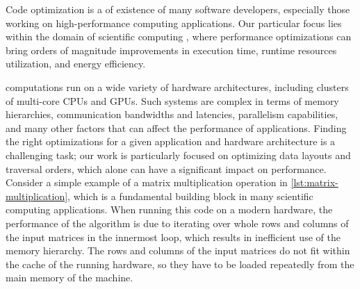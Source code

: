 







Code optimization is a  of existence of many software developers, especially those working on high-performance computing applications. Our particular focus lies within the domain of scientific computing , where performance optimizations can bring orders of magnitude improvements in execution time, runtime resources utilization, and energy efficiency.

 computations run on a wide variety of hardware architectures, including clusters of multi-core CPUs and GPUs. Such systems are complex in terms of memory hierarchies, communication bandwidths and latencies, parallelism capabilities, and many other factors that can affect the performance of applications. Finding the right optimizations for a given application and hardware architecture is a challenging task; our work is particularly focused on optimizing data layouts and traversal orders, which alone can have a significant impact on performance. Consider a simple example of a matrix multiplication operation in \cref{lst:matrix-multiplication}, which is a fundamental building block in many scientific computing applications.
When running this code on a modern hardware, the performance of the algorithm is  due to iterating over whole rows and columns of the input matrices in the innermost loop, which results in inefficient use of the memory hierarchy. The rows and columns of the input matrices do not fit within the cache of the running hardware, so they have to be loaded repeatedly from the main memory of the machine.


